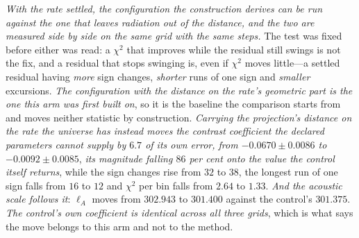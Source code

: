\documentclass[11pt,a4paper]{article}
\theoremstyle{plain}
\theoremstyle{definition}
\theoremstyle{remark}
\begin{document}
\emph{With the rate settled, the configuration the construction derives can be run against the one that
leaves radiation out of the distance, and the two are measured side by side on the same grid with the same
steps.} The test was fixed before either was read: a $\chi^{2}$ that improves while the residual still swings is not
the fix, and a residual that stops swinging is, even if $\chi^{2}$ moves little---a settled residual
having \emph{more} sign changes, \emph{shorter} runs of one sign and \emph{smaller} excursions.
\emph{The configuration with the distance on the rate's geometric part is the one this arm was first built
on}, so it is the baseline the comparison starts from and moves neither statistic by construction.
\emph{Carrying the projection's distance on the rate the universe has instead moves the contrast
coefficient the declared parameters cannot supply by $6.7$ of its own error, from $-0.0670\pm0.0086$ to
$-0.0092\pm0.0085$}, \emph{its magnitude falling $86$ per cent onto the value the control itself
returns}, while the sign changes rise from $32$ to $38$, the longest run of one sign falls from $16$ to
$12$ and $\chi^{2}$ per bin falls from $2.64$ to $1.33$. \emph{And the acoustic scale follows it}:
$\ell_A$ moves from $302.943$ to $301.400$ against the control's $301.375$. \emph{The control's own coefficient is identical
across all three grids}, which is what says the move belongs to this arm and not to the
method.
\end{document}
